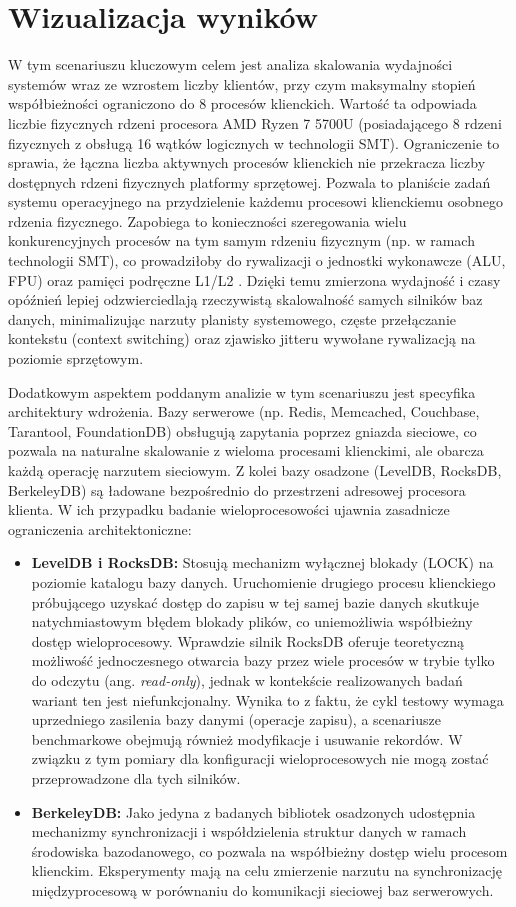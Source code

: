 \section{Wizualizacja wyników}
W tym scenariuszu kluczowym celem jest analiza skalowania wydajności systemów wraz ze wzrostem liczby klientów, przy czym maksymalny stopień współbieżności ograniczono do 8 procesów klienckich. Wartość ta odpowiada liczbie fizycznych rdzeni procesora AMD Ryzen 7 5700U (posiadającego 8 rdzeni fizycznych z obsługą 16 wątków logicznych w technologii SMT). Ograniczenie to sprawia, że łączna liczba aktywnych procesów klienckich nie przekracza liczby dostępnych rdzeni fizycznych platformy sprzętowej. Pozwala to planiście zadań systemu operacyjnego na przydzielenie każdemu procesowi klienckiemu osobnego rdzenia fizycznego. Zapobiega to konieczności szeregowania wielu konkurencyjnych procesów na tym samym rdzeniu fizycznym (np. w ramach technologii SMT), co prowadziłoby do rywalizacji o jednostki wykonawcze (ALU, FPU) oraz pamięci podręczne L1/L2 \cite{love2010, kleppmann2017}. Dzięki temu zmierzona wydajność i czasy opóźnień lepiej odzwierciedlają rzeczywistą skalowalność samych silników baz danych, minimalizując narzuty planisty systemowego, częste przełączanie kontekstu (context switching) oraz zjawisko jitteru wywołane rywalizacją na poziomie sprzętowym.

Dodatkowym aspektem poddanym analizie w tym scenariuszu jest specyfika architektury wdrożenia. Bazy serwerowe (np. Redis, Memcached, Couchbase, Tarantool, FoundationDB) obsługują zapytania poprzez gniazda sieciowe, co pozwala na naturalne skalowanie z wieloma procesami klienckimi, ale obarcza każdą operację narzutem sieciowym. Z kolei bazy osadzone (LevelDB, RocksDB, BerkeleyDB) są ładowane bezpośrednio do przestrzeni adresowej procesora klienta. W ich przypadku badanie wieloprocesowości ujawnia zasadnicze ograniczenia architektoniczne:
\begin{itemize}
    \item \textbf{LevelDB i RocksDB:} Stosują mechanizm wyłącznej blokady (LOCK) na poziomie katalogu bazy danych. Uruchomienie drugiego procesu klienckiego próbującego uzyskać dostęp do zapisu w tej samej bazie danych skutkuje natychmiastowym błędem blokady plików, co uniemożliwia współbieżny dostęp wieloprocesowy. Wprawdzie silnik RocksDB oferuje teoretyczną możliwość jednoczesnego otwarcia bazy przez wiele procesów w trybie tylko do odczytu (ang. \emph{read-only}), jednak w kontekście realizowanych badań wariant ten jest niefunkcjonalny. Wynika to z faktu, że cykl testowy wymaga uprzedniego zasilenia bazy danymi (operacje zapisu), a scenariusze benchmarkowe obejmują również modyfikacje i usuwanie rekordów. W związku z tym pomiary dla konfiguracji wieloprocesowych nie mogą zostać przeprowadzone dla tych silników.
    \item \textbf{BerkeleyDB:} Jako jedyna z badanych bibliotek osadzonych udostępnia mechanizmy synchronizacji i współdzielenia struktur danych w ramach środowiska bazodanowego, co pozwala na współbieżny dostęp wielu procesom klienckim. Eksperymenty mają na celu zmierzenie narzutu na synchronizację międzyprocesową w porównaniu do komunikacji sieciowej baz serwerowych.
\end{itemize}

